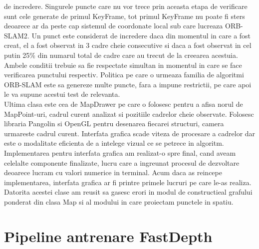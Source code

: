 \documentclass[12pt,a4paper]{report}
\begin{document}
de incredere. Singurele puncte care nu vor trece prin aceasta etapa de verificare sunt
cele generate de primul KeyFrame, tot primul KeyFrame nu poate fi sters deoarece 
ar da peste cap sistemul de coordonate local sub care lucreaza ORB-SLAM2. Un punct 
este considerat de incredere daca din momentul in care a fost creat, el a fost 
observat in 3 cadre cheie consecutive si daca a fost observat in cel putin 25\% din 
numarul total de cadre care au trecut de la creearea acestuia. Ambele conditii 
trebuie sa fie respectate simultan in momentul in care se face verificarea punctului
respectiv. Politica pe care o urmeaza familia de algoritmi ORB-SLAM este sa genereze 
multe puncte, fara a impune restrictii, pe care apoi le va supune acestui test de 
relevanta. \\

Ultima clasa este cea de MapDrawer pe care o folosesc pentru a afisa norul de MapPoint-uri,
cadrul curent analizat si pozitiile cadrelor cheie observate. Folosesc libraria Pangolin si 
OpenGL pentru desenarea fiecarei structuri, camera urmareste cadrul curent. Interfata grafica 
scade viteza de procesare a cadrelor dar este o modalitate eficienta de a intelege vizual ce 
se petrece in algoritm. Implementarea pentru interfata grafica am realizat-o spre final, cand 
aveam celelalte componente finalizate, lucru care a ingreunat procesul de dezvoltare deoarece 
lucram cu valori numerice in terminal. Acum daca as reincepe implementarea, interfata grafica ar fi
printre primele lucruri pe care le-as realiza. Datorita acestei clase am reusit sa gasesc erori in
modul de constructieal grafului ponderat din clasa Map si al modului in care proiectam punctele 
in spatiu.

\section{Pipeline antrenare FastDepth}
\end{document}
